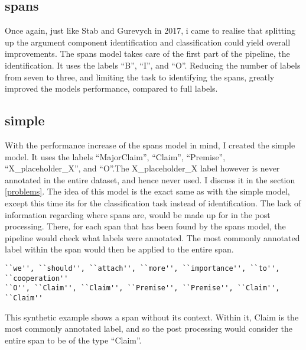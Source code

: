 \documentclass[12]{article}
\theoremstyle{mytheoremstyle}
\theoremstyle{mytheoremstyle}
\theoremstyle{myproblemstyle}
\begin{document}
  \subsection{spans} \label{spans}
  Once again, just like Stab and Gurevych in 2017, i came to realise that splitting up the argument component identification and classification could yield overall improvements. The spans model takes care of the first part of the pipeline, the identification. It uses the labels ``B'', ``I'', and ``O''. Reducing the number of labels from seven to three, and limiting the task to identifying the spans, greatly improved the models performance, compared to full labels.
  \subsection{simple} \label{simple}
  With the performance increase of the spans model in mind, I created the simple model. It uses the labels ``MajorClaim'', ``Claim'', ``Premise'', ``X\_placeholder\_X'', and ``O''.The X\_placeholder\_X label however is never annotated in the entire dataset, and hence never used. I discuss it in the section \ref{problems}.
 The idea of this model is the exact same as with the simple model, except this time its for the classification task instead of identification. The lack of information regarding where spans are, would be made up for in the post processing. There, for each span that has been found by the spans model, the pipeline would check what labels were annotated. The most commonly annotated label within the span would then be applied to the entire span.  
  \begin{verbatim}
``we'', ``should'', ``attach'', ``more'', ``importance'', ``to'', ``cooperation''
``O'', ``Claim'', ``Claim'', ``Premise'', ``Premise'', ``Claim'', ``Claim''
  \end{verbatim}
  This synthetic example shows a span without its context. Within it, Claim is the most commonly annotated label, and so the post processing would consider the entire span to be of the type ``Claim''.
\end{document}

